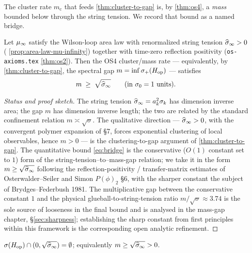 The cluster rate $m_{\mathrm c}$ that feeds \cref{thm:cluster-to-gap}
is, by \cref{thm:os4}, a \emph{mass} bounded below through the string
tension.  We record that bound as a named bridge.

\begin{theorem}
\label{thm:area-law-to-gap-bridge}
Let $\mu_\infty$ satisfy the Wilson-loop area law with renormalized string
tension $\widehat{\sigma}_\infty > 0$ (
\cref{prop:area-law-mu-infinity}) together with time-zero reflection
positivity (\texttt{os-axioms.tex} \cref{thm:os2}).  Then the OS4
cluster/mass rate --- equivalently, by \cref{thm:cluster-to-gap}, the
spectral gap $m = \inf\sigma_+(H_{\mathrm{op}})$ --- satisfies
\begin{equation}
  \label{eq:bridge}
  m \;\ge\; \sqrt{\widehat{\sigma}_\infty}
  \qquad (\text{in } \sigma_0 = 1 \text{ units}).
\end{equation}
\end{theorem}

\begin{proof}[Status and proof sketch]
The string tension $\widehat{\sigma}_\infty = a_k^2\sigma_k$ has dimension inverse
area; the gap $m$ has dimension inverse length; the two are related by
the standard confinement relation $m \asymp \sqrt{\sigma}$.  The
qualitative direction --- $\widehat{\sigma}_\infty > 0$, with the convergent polymer
expansion of  \S7, forces exponential
clustering of local observables, hence $m > 0$ --- is the
clustering-to-gap argument of \cref{thm:cluster-to-gap}.  The
quantitative bound \eqref{eq:bridge} is the conservative ($O(1)$
constant set to $1$) form of the string-tension--to--mass-gap
relation; we take it in the form $m \ge \sqrt{\widehat{\sigma}_\infty}$ following the
reflection-positivity / transfer-matrix estimates of
Osterwalder--Seiler and Simon \emph{$P(\phi)_2$} \S6, with the sharper
constant the subject of Brydges--Federbush 1981.  The multiplicative
gap between the conservative constant $1$ and the physical
glueball-to-string-tension ratio $m/\sqrt{\sigma}\approx 3.74$ is the
sole source of looseness in the final bound and is analysed in
the mass-gap chapter, \S\ref{sec:sharpness}; establishing the sharp
constant from first principles within this framework is the
corresponding open analytic refinement.
\end{proof}

\begin{corollary}
\label{cor:gap-from-sigma}
$\sigma(H_{\mathrm{op}}) \cap (0, \sqrt{\widehat{\sigma}_\infty}) = \emptyset$; equivalently
$m \ge \sqrt{\widehat{\sigma}_\infty} > 0$.
\end{corollary}

